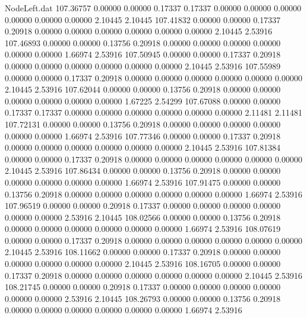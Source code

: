 \begin{filecontents}{NodeLeft.dat}
 107.36757    0.00000    0.00000     0.17337    0.17337    0.00000    0.00000    0.00000    0.00000    0.00000    0.00000    2.10445    2.10445
 107.41832    0.00000    0.00000     0.17337    0.20918    0.00000    0.00000    0.00000    0.00000    0.00000    0.00000    2.10445    2.53916
 107.46893    0.00000    0.00000     0.13756    0.20918    0.00000    0.00000    0.00000    0.00000    0.00000    0.00000    1.66974    2.53916
 107.50945    0.00000    0.00000     0.17337    0.20918    0.00000    0.00000    0.00000    0.00000    0.00000    0.00000    2.10445    2.53916
 107.55989    0.00000    0.00000     0.17337    0.20918    0.00000    0.00000    0.00000    0.00000    0.00000    0.00000    2.10445    2.53916
 107.62044    0.00000    0.00000     0.13756    0.20918    0.00000    0.00000    0.00000    0.00000    0.00000    0.00000    1.67225    2.54299
 107.67088    0.00000    0.00000     0.17337    0.17337    0.00000    0.00000    0.00000    0.00000    0.00000    0.00000    2.11481    2.11481
 107.72131    0.00000    0.00000     0.13756    0.20918    0.00000    0.00000    0.00000    0.00000    0.00000    0.00000    1.66974    2.53916
 107.77346    0.00000    0.00000     0.17337    0.20918    0.00000    0.00000    0.00000    0.00000    0.00000    0.00000    2.10445    2.53916
 107.81384    0.00000    0.00000     0.17337    0.20918    0.00000    0.00000    0.00000    0.00000    0.00000    0.00000    2.10445    2.53916
 107.86434    0.00000    0.00000     0.13756    0.20918    0.00000    0.00000    0.00000    0.00000    0.00000    0.00000    1.66974    2.53916
 107.91475    0.00000    0.00000     0.13756    0.20918    0.00000    0.00000    0.00000    0.00000    0.00000    0.00000    1.66974    2.53916
 107.96519    0.00000    0.00000     0.20918    0.17337    0.00000    0.00000    0.00000    0.00000    0.00000    0.00000    2.53916    2.10445
 108.02566    0.00000    0.00000     0.13756    0.20918    0.00000    0.00000    0.00000    0.00000    0.00000    0.00000    1.66974    2.53916
 108.07619    0.00000    0.00000     0.17337    0.20918    0.00000    0.00000    0.00000    0.00000    0.00000    0.00000    2.10445    2.53916
 108.11662    0.00000    0.00000     0.17337    0.20918    0.00000    0.00000    0.00000    0.00000    0.00000    0.00000    2.10445    2.53916
 108.16705    0.00000    0.00000     0.17337    0.20918    0.00000    0.00000    0.00000    0.00000    0.00000    0.00000    2.10445    2.53916
 108.21745    0.00000    0.00000     0.20918    0.17337    0.00000    0.00000    0.00000    0.00000    0.00000    0.00000    2.53916    2.10445
 108.26793    0.00000    0.00000     0.13756    0.20918    0.00000    0.00000    0.00000    0.00000    0.00000    0.00000    1.66974    2.53916

\end{filecontents}
